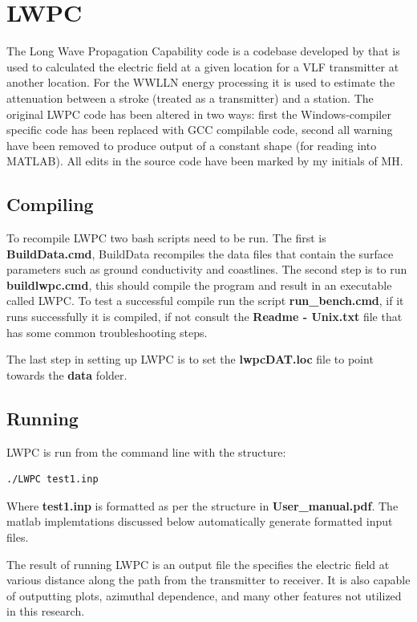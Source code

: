 \section{LWPC}

The Long Wave Propagation Capability code is a codebase developed by \citet{Ferguson1998} that is used to calculated the electric field at a given location for a VLF transmitter at another location.
For the WWLLN energy processing it is used to estimate the attenuation between a stroke (treated as a transmitter) and a station.
The original LWPC code has been altered in two ways: first the Windows-compiler specific code has been replaced with GCC compilable code, second all warning have been removed to produce output of a constant shape (for reading into MATLAB).
All edits in the source code have been marked by my initials of MH.

\subsection{Compiling}

To recompile LWPC two bash scripts need to be run.
The first is \textbf{BuildData.cmd}, BuildData recompiles the data files that contain the surface parameters such as ground conductivity and coastlines.
The second step is to run \textbf{buildlwpc.cmd}, this should compile the program and result in an executable called LWPC.
To test a successful compile run the script \textbf{run\_bench.cmd}, if it runs successfully it is compiled, if not consult the \textbf{Readme - Unix.txt} file that has some common troubleshooting steps.

The last step in setting up LWPC is to set the \textbf{lwpcDAT.loc} file to point towards the \textbf{data} folder.

\subsection{Running}

LWPC is run from the command line with the structure:

\begin{verbatim}
./LWPC test1.inp
\end{verbatim}

Where \textbf{test1.inp} is formatted as per the structure in \textbf{User\_manual.pdf}.
The matlab implemtations discussed below automatically generate formatted input files.

The result of running LWPC is an output file the specifies the electric field at various distance along the path from the transmitter to receiver.
It is also capable of outputting plots, azimuthal dependence, and many other features not utilized in this research.

